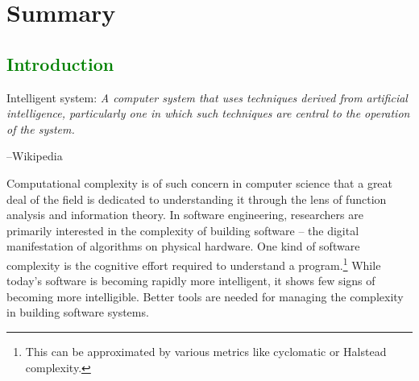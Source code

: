 \documentclass[12pt,initial,twoside,maitrise]{dms}
\newcommand{\mediumwell}[1]{\textcolor{green}{#1}}
\numberwithin{equation}{section}
\numberwithin{table}{chapter}
\numberwithin{figure}{chapter}
\begin{document}

\chapter*{Summary}


\anglais
\cleardoublepage
{}  %
\tableofcontents
\cleardoublepage
{}  %
\listoftables
\cleardoublepage
{}
\listoffigures

\NoChapterPageNumber
\cleardoublepage
{}

\mediumwell{\chapter{Introduction}\label{ch:introduction}}

\setlength{\epigraphwidth}{0.9\textwidth}
\epigraph{Intelligent system: \textit{A computer system that uses techniques derived from artificial intelligence, particularly one in which such techniques are central to the operation of the system.}}{\begin{flushright}--Wikipedia\end{flushright}}

Computational complexity is of such concern in computer science that a great deal of the field is dedicated to understanding it through the lens of function analysis and information theory. In software engineering, researchers are primarily interested in the complexity of building software -- the digital manifestation of algorithms on physical hardware. One kind of software complexity is the cognitive effort required to understand a program.\footnote{This can be approximated by various metrics like cyclomatic or Halstead complexity.} While today’s software is becoming rapidly more intelligent, it shows few signs of becoming more intelligible. Better tools are needed for managing the complexity in building software systems.
\end{document}
